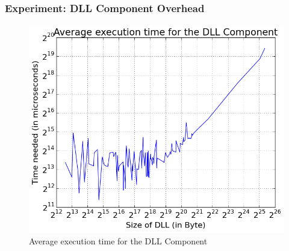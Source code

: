 \subsubsection{Experiment: DLL Component Overhead}
\begin{figure}[h]
	\centering
    \includegraphics[width=\textwidth,height=0.45\textheight,keepaspectratio]{Evaluation/experiment2/result.png}
    \caption{Average execution time for the DLL Component}
    \label{fig:ex2_result}
\end{figure}
